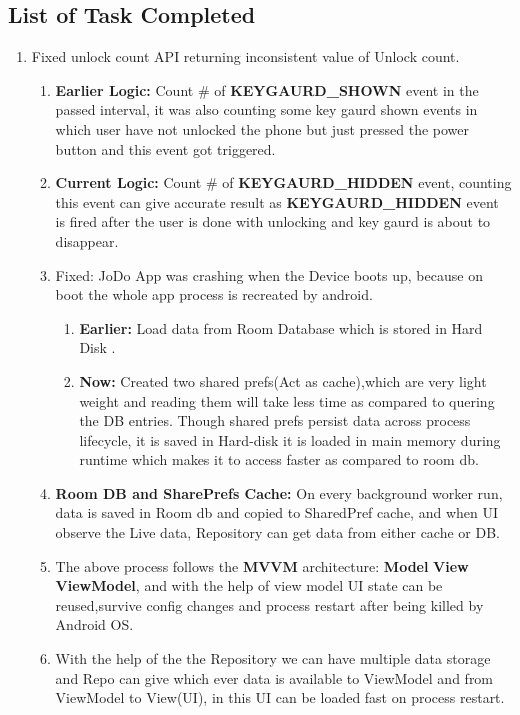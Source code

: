 \documentclass[12pt]{article}
\begin{document}
\begin{enumerate}
    \subsection{List of Task Completed}
    \begin{enumerate}
        \item Fixed unlock count API returning inconsistent value of Unlock count.
        \begin{enumerate}
            \item \textbf{Earlier Logic: } Count \# of \textbf{KEYGAURD\_SHOWN} event in the passed interval, it was also counting some key gaurd shown events in which user have not unlocked the phone but just pressed the power button and this event got triggered.
            \item \textbf{Current Logic: } Count \# of \textbf{KEYGAURD\_HIDDEN} event, counting this event can give accurate result as \textbf{KEYGAURD\_HIDDEN} event is fired after the user is done with unlocking and key gaurd is about to disappear.
            \item Fixed: JoDo App was crashing when the Device boots up, because on boot the whole app process is recreated by android.
            \begin{enumerate}
                \item \textbf{Earlier: } Load data from Room Database which is stored in Hard Disk .
                \item \textbf{Now: } Created two shared prefs(Act as cache),which are very light weight and reading them will take less time as compared to quering the DB entries. Though shared prefs persist data across process lifecycle, it is saved in Hard-disk it is loaded in main memory during runtime which makes it to access faster as compared to room db.
                 \end{enumerate}
                \item \textbf{Room DB and SharePrefs Cache: } On every background worker run, data is saved in Room db and copied to SharedPref cache, and when UI observe the Live data, Repository can get data from either cache or DB.
                \item The above process follows the \textbf{MVVM} architecture: \textbf{Model} \textbf{View} \textbf{ViewModel}, and with the help of view model UI state can be reused,survive config changes and process restart after being killed by Android OS.
                \item With the help of the the Repository we can have multiple data storage and Repo can give which ever data is available to ViewModel and from ViewModel to View(UI), in this UI can be loaded fast on process restart.

\end{enumerate}
\end{enumerate}
\end{enumerate}
\end{document}
